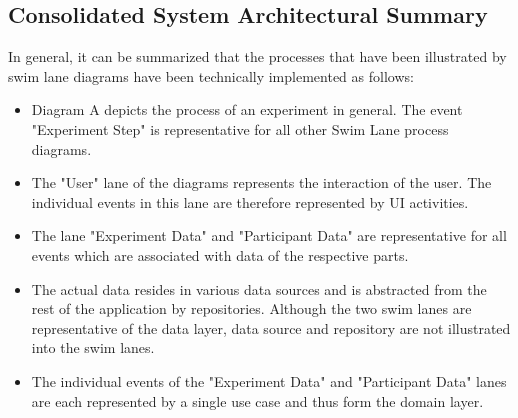 \subsection{Consolidated System Architectural Summary}\label{subsec:completeArchitecture}

In general, it can be summarized that the processes that have been illustrated by swim lane diagrams have been technically implemented as follows:
\begin{itemize}
    \item Diagram A depicts the process of an experiment in general. The event "Experiment Step" is representative for all other Swim Lane process diagrams.
    \item The "User" lane of the diagrams represents the interaction of the user. The individual events in this lane are therefore represented by UI activities.
    \item The lane "Experiment Data" and "Participant Data" are representative for all events which are associated with data of the respective parts. 
    \item The actual data resides in various data sources and is abstracted from the rest of the application by repositories. Although the two swim lanes are representative of the data layer, data source and repository are not illustrated into the swim lanes.
    \item The individual events of the "Experiment Data" and "Participant Data" lanes are each represented by a single use case and thus form the domain layer.
\end{itemize}








